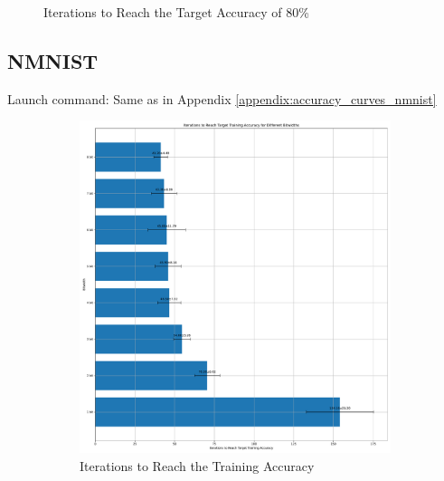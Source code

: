 \begin{figure}[H]
\begin{subfigure}[H]{0.48\textwidth}
     \end{subfigure}
            \caption{Iterations to Reach the Target Accuracy of 80\%}
        \end{figure}

    \subsection{NMNIST}
    \label{appendix:iterations_nmnist}
        Launch command: Same as in Appendix \ref{appendix:accuracy_curves_nmnist}
        \begin{figure}[H]
            \centering
            \begin{subfigure}[H]{0.48\textwidth}
                \centering
                \includegraphics[width=\textwidth]{../standard/NMNIST/plots/nmnist_train_iters.pdf}
                \caption{Iterations to Reach the Training Accuracy}
            \end{subfigure}
            \hfill
            \begin{subfigure}[H]{0.48\textwidth}
                \centering

\end{subfigure}
\end{figure}
